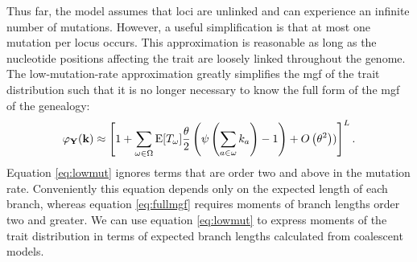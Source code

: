 Thus far, the model assumes that loci are unlinked and can experience an
infinite number of mutations. However, a useful simplification is that at most
one mutation per locus occurs. This approximation is reasonable as long as the
nucleotide positions affecting the trait are loosely linked throughout the
genome. The low-mutation-rate approximation greatly simplifies the mgf of the
trait distribution such that it is no longer necessary to know the full form of
the mgf of the genealogy:
\begin{equation}
\label{eq:lowmut}
\varphi_{\mathbf{Y}}(\mathbf{k}) \approx \left[ 1 + \sum_{\omega \in \Omega}
  \mathrm{E}[T_\omega] \frac{\theta}{2} \left( \psi\left( \sum_{a \in \omega} k_a\right) -1 \right) +
  O\left( \theta^2 \right))\right]^L.
\end{equation}
Equation \eqref{eq:lowmut} ignores terms that are order two and above in the
mutation rate. Conveniently this equation depends only on the expected length of
each branch, whereas equation \eqref{eq:fullmgf} requires moments of branch
lengths order two and greater. We can use equation \eqref{eq:lowmut} to express
moments of the trait distribution in terms of expected branch lengths calculated
from coalescent models.

